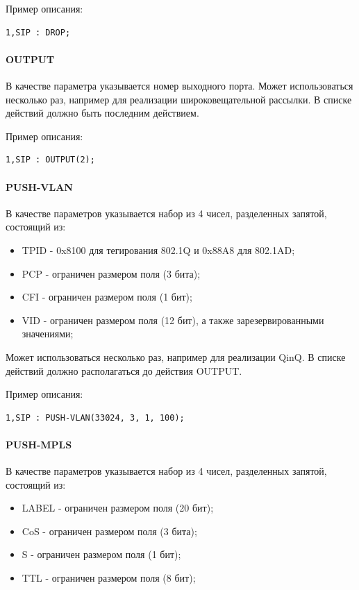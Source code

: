 Пример описания:
\begin{lstlisting}
1,SIP : DROP;
\end{lstlisting}

\paragraph{OUTPUT}

В качестве параметра указывается номер выходного порта. Может использоваться несколько раз, например для реализации широковещательной рассылки. В списке действий должно быть последним действием.

Пример описания:
\begin{lstlisting}
1,SIP : OUTPUT(2);
\end{lstlisting}

\paragraph{PUSH-VLAN}

В качестве параметров указывается набор из 4 чисел, разделенных запятой, состоящий из:
\begin{itemize}
\item TPID - 0x8100 для тегирования 802.1Q и 0x88A8 для 802.1AD;
\item PCP - ограничен размером поля (3 бита);
\item CFI - ограничен размером поля (1 бит);
\item VID - ограничен размером поля (12 бит), а также зарезервированными значениями;
\end{itemize}

Может использоваться несколько раз, например для реализации QinQ. В списке действий должно располагаться до действия OUTPUT.

Пример описания:
\begin{lstlisting}
1,SIP : PUSH-VLAN(33024, 3, 1, 100);
\end{lstlisting}

\paragraph{PUSH-MPLS}

В качестве параметров указывается набор из 4 чисел, разделенных запятой, состоящий из:
\begin{itemize}
\item LABEL - ограничен размером поля (20 бит);
\item CoS - ограничен размером поля (3 бита);
\item S - ограничен размером поля (1 бит);
\item TTL - ограничен размером поля (8 бит);
\end{itemize}

